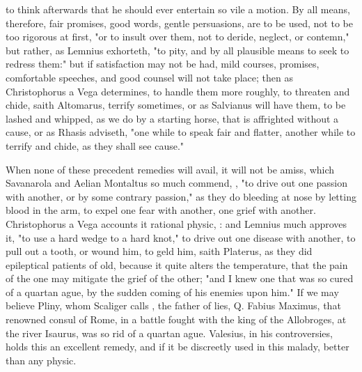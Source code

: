 {to think afterwards that he should ever entertain so vile a motion. By all means, therefore, fair promises, good words, gentle persuasions, are to be used, not to be too rigorous at first, "or to insult over them, not to deride, neglect, or contemn," but rather, as Lemnius exhorteth, "to pity, and by all plausible means to seek to redress them:" but if satisfaction may not be had, mild courses, promises, comfortable speeches, and good counsel will not take place; then as Christophorus a Vega determines,  to handle them more roughly, to threaten and chide, saith Altomarus, terrify sometimes, or as Salvianus will have them, to be lashed and whipped, as we do by a starting horse, that is affrighted without a cause, or as Rhasis adviseth, "one while to speak fair and flatter, another while to terrify and chide, as they shall see cause."

When none of these precedent remedies will avail, it will not be amiss, which Savanarola and Aelian Montaltus so much commend, , "to drive out one passion with another, or by some contrary passion," as they do bleeding at nose by letting blood in the arm, to expel one fear with another, one grief with another. Christophorus a Vega accounts it rational physic, : and Lemnius much approves it, "to use a hard wedge to a hard knot," to drive out one disease with another, to pull out a tooth, or wound him, to geld him, saith Platerus, as they did epileptical patients of old, because it quite alters the temperature, that the pain of the one may mitigate the grief of the other; "and I knew one that was so cured of a quartan ague, by the sudden coming of his enemies upon him." If we may believe Pliny, whom Scaliger calls , the father of lies, Q. Fabius Maximus, that renowned consul of Rome, in a battle fought with the king of the Allobroges, at the river Isaurus, was so rid of a quartan ague. Valesius, in his controversies, holds this an excellent remedy, and if it be discreetly used in this malady, better than any physic.

}
